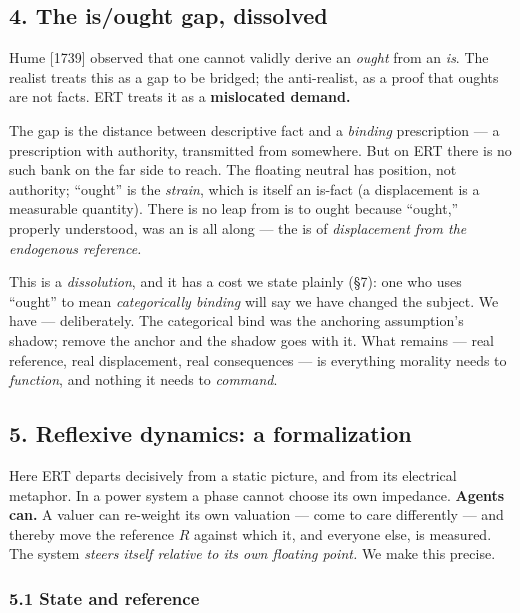 \documentclass[
]{article}
\begin{document}
\subsection{4. The is/ought gap,
dissolved}\label{the-isought-gap-dissolved}

Hume {[}1739{]} observed that one cannot validly derive an \emph{ought}
from an \emph{is}. The realist treats this as a gap to be bridged; the
anti-realist, as a proof that oughts are not facts. ERT treats it as a
\textbf{mislocated demand.}

The gap is the distance between descriptive fact and a \emph{binding}
prescription --- a prescription with authority, transmitted from
somewhere. But on ERT there is no such bank on the far side to reach.
The floating neutral has position, not authority; ``ought'' is the
\emph{strain}, which is itself an is-fact (a displacement is a
measurable quantity). There is no leap from is to ought because
``ought,'' properly understood, was an is all along --- the is of
\emph{displacement from the endogenous reference.}

This is a \emph{dissolution}, and it has a cost we state plainly (§7):
one who uses ``ought'' to mean \emph{categorically binding} will say we
have changed the subject. We have --- deliberately. The categorical bind
was the anchoring assumption's shadow; remove the anchor and the shadow
goes with it. What remains --- real reference, real displacement, real
consequences --- is everything morality needs to \emph{function}, and
nothing it needs to \emph{command}.

\subsection{5. Reflexive dynamics: a
formalization}\label{reflexive-dynamics-a-formalization}

Here ERT departs decisively from a static picture, and from its
electrical metaphor. In a power system a phase cannot choose its own
impedance. \textbf{Agents can.} A valuer can re-weight its own valuation
--- come to care differently --- and thereby move the reference \(R\)
against which it, and everyone else, is measured. The system
\emph{steers itself relative to its own floating point.} We make this
precise.

\subsubsection{5.1 State and reference}\label{state-and-reference}
\end{document}
